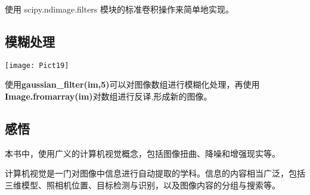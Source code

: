 \documentclass[a4paper, 12pt]{article}
\begin{document}
使用 scipy.ndimage.filters 模块的标准卷积操作来简单地实现。
\subsection{\small 模糊处理}
\texttt{[image: Pict19]}

使用\textbf{gaussian\_filter(im,5)}可以对图像数组进行模糊化处理，再使用\textbf{Image.fromarray(im)}对数组进行反译,形成新的图像。
\subsection{\small 感悟}
本书中，使用广义的计算机视觉概念，包括图像扭曲、降噪和增强现实等。

计算机视觉是一门对图像中信息进行自动提取的学科。信息的内容相当广泛，包括三维模型、照相机位置、目标检测与识别，以及图像内容的分组与搜索等。
\end{document}

